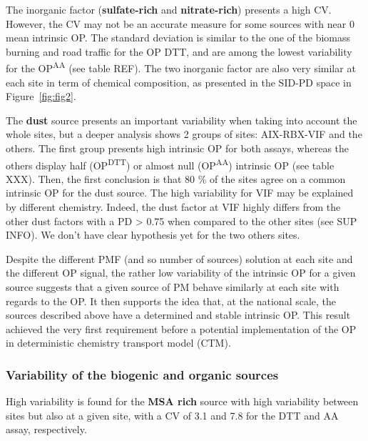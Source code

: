 \documentclass[acp]{copernicus}
\begin{document}
The inorganic factor (\textbf{sulfate-rich} and \textbf{nitrate-rich})
presents a high CV. However, the CV may not be an accurate measure for
some sources with near 0 mean intrinsic OP. The standard deviation is
similar to the one of the biomass burning and road traffic for the OP
DTT, and are among the lowest variability for the OP\textsuperscript{AA}
(see table REF). The two inorganic factor are also very similar at each
site in term of chemical composition, as presented in the SID-PD space
in Figure~\ref{fig:fig2}.

The \textbf{dust} source presents an important variability when taking
into account the whole sites, but a deeper analysis shows 2 groups of
sites: AIX-RBX-VIF and the others. The first group presents high
intrinsic OP for both assays, whereas the others display half
(OP\textsuperscript{DTT}) or almost null (OP\textsuperscript{AA})
intrinsic OP (see table XXX). Then, the first conclusion is that 80 \%
of the sites agree on a common intrinsic OP for the dust source. The
high variability for VIF may be explained by different chemistry.
Indeed, the dust factor at VIF highly differs from the other dust
factors with a PD \textgreater{} 0.75 when compared to the other sites
(see SUP INFO). We don't have clear hypothesis yet for the two others
sites.

Despite the different PMF (and so number of sources) solution at each
site and the different OP signal, the rather low variability of the
intrinsic OP for a given source suggests that a given source of PM
behave similarly at each site with regards to the OP. It then supports
the idea that, at the national scale, the sources described above have a
determined and stable intrinsic OP. This result achieved the very first
requirement before a potential implementation of the OP in deterministic
chemistry transport model (CTM).

\subsubsection{Variability of the biogenic and organic sources}%
\label{variability-of-the-biogenic-and-organic-sources}

High variability is found for the \textbf{MSA rich} source with high
variability between sites but also at a given site, with a CV of 3.1 and
7.8 for the DTT and AA assay, respectively.
\end{document}
